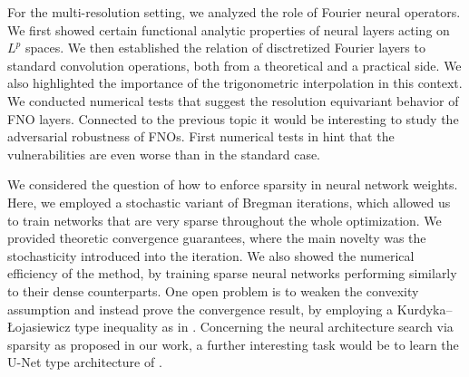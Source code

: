 For the multi-resolution setting, we analyzed the role of Fourier neural operators. We first showed certain functional analytic properties of neural layers acting on $L^p$ spaces. We then established the relation of disctretized Fourier layers to standard convolution operations, both from a theoretical and a practical side. We also highlighted the importance of the trigonometric interpolation in this context. We conducted numerical tests that suggest the resolution equivariant behavior of FNO layers. Connected to the previous topic it would be interesting to study the adversarial robustness of FNOs. First numerical tests in \cite{kabri2022FNO} hint that the vulnerabilities are even worse than in the standard case.

We considered the question of how to enforce sparsity in neural network weights. Here, we employed a stochastic variant of Bregman iterations, which allowed us to train networks that are very sparse throughout the whole optimization. We provided theoretic convergence guarantees, where the main novelty was the stochasticity introduced into the iteration. We also showed the numerical efficiency of the method, by training sparse neural networks performing similarly to their dense counterparts. One open problem is to weaken the convexity assumption and instead prove the convergence result, by employing a Kurdyka–\L{}ojasiewicz type inequality as in \cite{benning2018choose}. Concerning the neural architecture search via sparsity as proposed in our work, a further interesting task would be to learn the U-Net type architecture of \cite{ronneberger2015u}.
